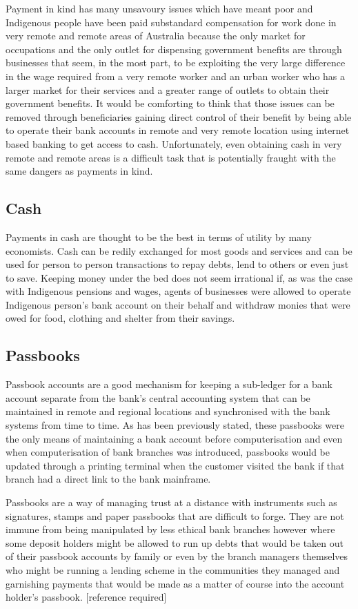 Payment in kind has many unsavoury issues which have meant poor and Indigenous people have been paid substandard compensation for work done in very remote and remote areas of Australia because the only market for occupations and the only outlet for dispensing government benefits are through businesses that seem, in the most part, to be exploiting the very large difference in the wage required from a very remote worker and an urban worker who has a larger market for their services and a greater range of outlets to obtain their government benefits. It would be comforting to think that those issues can be removed through beneficiaries gaining direct control of their benefit by being able to operate their bank accounts in remote and very remote location using internet based banking to get access to cash. Unfortunately, even obtaining cash in very remote and remote areas is a difficult task that is potentially fraught with the same dangers as payments in kind.

\subsection{Cash}
Payments in cash are thought to be the best in terms of utility by many economists. Cash can be redily exchanged for most goods and services and can be used for person to person transactions to repay debts, lend to others or even just to save. Keeping money under the bed does not seem irrational if, as was the case with Indigenous pensions and wages, agents of businesses were allowed to operate Indigenous person's bank account on their behalf and withdraw monies that were owed for food, clothing and shelter from their savings. 

\subsection{Passbooks}
Passbook accounts are a good mechanism for keeping a sub-ledger for a bank account separate from the bank's central accounting system that can be maintained in remote and regional locations and synchronised with the bank systems from time to time. As has been previously stated, these passbooks were the only means of maintaining a bank account before computerisation and even when computerisation of bank branches was introduced, passbooks would be updated through a printing terminal when the customer visited the bank if that branch had a direct link to the bank mainframe.

Passbooks are a way of managing trust at a distance with instruments such as signatures, stamps and paper passbooks that are difficult to forge. They are not immune from being manipulated by less ethical bank branches however where some deposit holders might be allowed to run up debts that would be taken out of their passbook accounts by family or even by the branch managers themselves who might be running a lending scheme in the communities they managed and garnishing payments that would be made as a matter of course into the account holder's passbook. [reference required]

